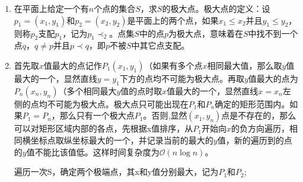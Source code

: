 \documentclass[12pt,a4paper]{article}
\makeatletter
\newtheorem*{solution}{Solution}
\theoremstyle{definition}
\renewenvironment{solution}[1][Solution] {\par\pushQED{\qed}\normalfont\topsep6\p@\@plus6\p@\relax\trivlist\item[\hskip\labelsep\bfseries#1\@addpunct{.}]\ignorespaces}{\popQED\endtrivlist\@endpefalse} \makeatother
\makeatother
\begin{document}
\begin{enumerate}
\item 在平面上给定一个有$n$个点的集合$S$，求$S$的极大点。极大点的定义：设$p_1=(x_1,y_1)$和$p_2=(x_2,y_2)$是平面上的两个点，如果$x_1\le x_2$并且$y_1\le y_2$，则称$p_2$支配$p_1$，记为$p_1\prec_2$。点集$S$中的点$p$为极大点，意味着在$S$中找不到一个点$q$，$q\ne p$并且$p\prec q$，即$p$不被$S$中其它点支配。
\begin{solution}
	首先取$x$值最大的点记作$P_1(x_1,y_1)$（如果有多个点$x$相同最大值，那么取$y$值最大的一个，显然直线$y=y_1$下方的点均不可能为极大点。再取$y$值最大的点为$P_n(x_n,y_n)$（多个相同最大$y$值的点时取$x$值最大的一个，显然直线$x=x_n$左侧的点均不可能为极大点。极大点只可能出现在$P_1$和$P_n$确定的矩形范围内。如果$P_1=P_n$，那么只有一个极大点$P_1$。否则,显然$(x_1,y_n)$点是不存在的，那么可以对矩形区域内部的各点，先根据x值排序，从$P_1$开始向$x$的负方向遍历，相同横坐标点取纵坐标最大的一个，并记录当前的最大的$y$值，新的遍历到的点的$y$值不能比该值低。这样时间复杂度为$\mathcal{O}(n\log n)$。
	\begin{algorithm}
		遍历一次S，确定两个极端点，其x和y值分别最大，记为$P_1$和$P_2$;\\
	\end{algorithm}
\end{solution}
\end{enumerate}

\end{document}
